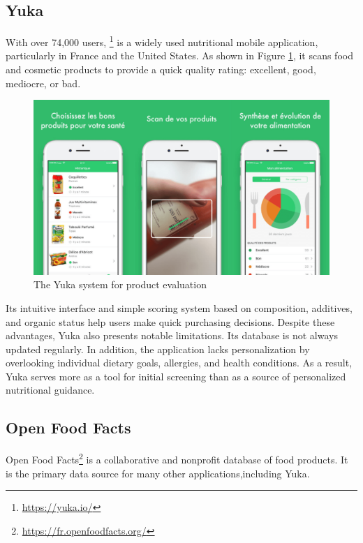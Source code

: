 \subsection{Yuka}
With over 74,000 users, \footnote{\url{https://yuka.io/}} is a widely used nutritional mobile application, particularly in France and the United States. As shown in Figure \ref{fig:yuka_evaluation}, it scans food and cosmetic products to provide a quick quality rating:
excellent, good, mediocre, or bad.
\begin{center}
\begin{figure}[H]
\includegraphics[scale=0.31]{images/yuka_evaluation.png}
\caption{The Yuka system for product evaluation}
\label{fig:yuka_evaluation}
\end{figure}
\end{center}
\par Its intuitive interface and simple scoring system based on composition,
additives, and organic status help users make quick purchasing decisions.
Despite these advantages, Yuka also presents notable limitations. Its
database is not always updated regularly. In addition, the application
lacks personalization by overlooking individual dietary goals, allergies,
and health conditions. As a result, Yuka serves more as a tool for initial
screening than as a source of personalized nutritional guidance.
\subsection{ Open Food Facts}
Open Food Facts\footnote{\url{https://fr.openfoodfacts.org/}} is a collaborative and nonprofit database of food
products. It is the primary data source for many other applications,including Yuka.


